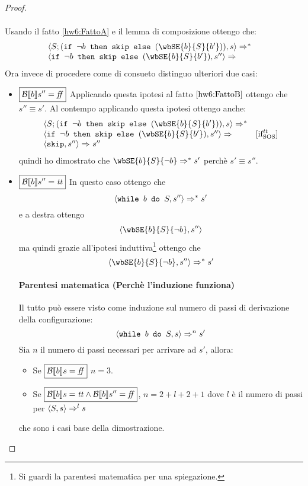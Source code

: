 {\begin{enumerate}
\begin{proof}
\begin{itemize}
$$\begin{array}{ll}
\end{array}
$$
Usando il fatto \ref{hw6:FattoA}  e il lemma di composizione ottengo che:
$$
\begin{array}{ll}
\confSs{S; (\ifABC{\neg b}{\skipForFriends}{(\wbSE{b}{S}{b'})})}{s} \Rar{*} & \\
\confSs{\ifABC{\neg b}{\skipForFriends}{(\wbSE{b}{S}{b'})}}{s''} \Rar{}
\end{array}
$$
Ora invece di procedere come di consueto distinguo ulteriori due casi:
\begin{itemize}
\item $\boxed{\mathcal{B} \llbracket b \rrbracket s'' = \mbox{\textit{ff}}}$
Applicando questa ipotesi al fatto $\ref{hw6:FattoB}$ ottengo che $\boxed{s'' \equiv s'}$.
Al contempo applicando questa ipotesi ottengo anche:
$$
\begin{array}{ll}
	\confSs{S; (\ifABC{\neg b}{\skipForFriends}{(\wbSE{b}{S}{b'})})}{s} \Rar{*} & \\
	\confSs{\ifABC{\neg b}{\skipForFriends}{(\wbSE{b}{S}{b'})}}{s''} \Rar{} & \ifttSOS \\
	\confSs{\skipForFriends}{s''} \Rar{ } s'' & \\
\end{array}
$$
quindi ho dimostrato che $\wbSE{b}{S}{\neg b} \Rar{*} s'$ perchè $s' \equiv s''$.
\item $\boxed{\mathcal{B} \llbracket b \rrbracket s'' = \mbox{\textit{tt}}}$	
In questo caso ottengo che
$$
\langle{}\mbox{\normalfont{\texttt{while }}} b \textrm{\normalfont{\texttt{ do }}} S, s''\rangle{} \Rightarrow^{*} s'
$$
e a destra ottengo
$$
\confSs{\wbSE{b}{S}{\neg b}}{s''}
$$
ma quindi grazie all'ipotesi induttiva\footnote{Si guardi la parentesi matematica per una spiegazione.} ottengo che
$$
\confSs{\wbSE{b}{S}{\neg b}}{s''} \Rar{*} s'
$$
\paragraph{Parentesi matematica (Perchè l'induzione funziona)}

Il tutto può essere visto come induzione sul numero di passi di derivazione
della configurazione: $$\langle{}\mbox{\normalfont{\texttt{while }}} b \textrm{\normalfont{\texttt{ do }}} S, s\rangle{} \Rightarrow^{n} s'$$
Sia $n$ il numero di passi necessari per arrivare ad $s'$, allora:
\begin{itemize}
\item Se $\boxed{\mathcal{B} \llbracket b \rrbracket s = \mbox{\textit{ff}}}$ $n = 3$.
\item Se $\boxed{\mathcal{B} \llbracket b \rrbracket s = \mbox{\textit{tt}} \land \mathcal{B} \llbracket b \rrbracket s'' = \mbox{\textit{ff}}}$, $n = 2 + l + 2 + 1$ dove $l$ è il numero
di passi per $\langle{}S, s\rangle{} \Rightarrow^{l} s$
\end{itemize}
che sono i casi base della dimostrazione.


\end{itemize}
\end{itemize}
\end{proof}
\end{enumerate}}
